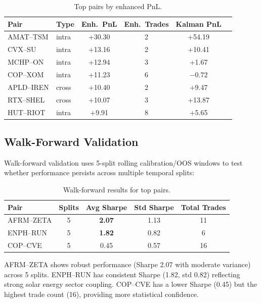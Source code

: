 \documentclass[11pt, a4paper]{article}
\begin{document}
\begin{table}[H]
\centering
\caption{Top pairs by enhanced PnL.}
\begin{tabular}{@{}llcccc@{}}
\toprule
\textbf{Pair} & \textbf{Type} & \textbf{Enh.\ PnL} & \textbf{Enh.\ Trades} & \textbf{Kalman PnL} \\
\midrule
AMAT--TSM   & intra & +30.30 & 2 & +54.19 \\
CVX--SU     & intra & +13.16 & 2 & +10.41 \\
MCHP--ON    & intra & +12.94 & 3 & +1.67  \\
COP--XOM    & intra & +11.23 & 6 & $-0.72$  \\
APLD--IREN  & cross & +10.40 & 2 & +9.47  \\
RTX--SHEL   & cross & +10.07 & 3 & +13.87 \\
HUT--RIOT   & intra & +9.91  & 8 & +5.65  \\
\bottomrule
\end{tabular}
\label{tab:top-enhanced}
\end{table}

\subsection{Walk-Forward Validation}

Walk-forward validation uses 5-split rolling calibration/OOS windows to test whether performance persists across multiple temporal splits:

\begin{table}[H]
\centering
\caption{Walk-forward results for top pairs.}
\begin{tabular}{@{}lcccc@{}}
\toprule
\textbf{Pair} & \textbf{Splits} & \textbf{Avg Sharpe} & \textbf{Std Sharpe} & \textbf{Total Trades} \\
\midrule
AFRM--ZETA  & 5 & \textbf{2.07} & 1.13 & 11 \\
ENPH--RUN   & 5 & \textbf{1.82} & 0.82 & 6  \\
COP--CVE    & 5 & 0.45          & 0.57 & 16 \\
\bottomrule
\end{tabular}
\label{tab:walk-forward}
\end{table}

AFRM--ZETA shows robust performance (Sharpe 2.07 with moderate variance) across 5 splits. ENPH--RUN has consistent Sharpe (1.82, std 0.82) reflecting strong solar energy sector coupling. COP--CVE has a lower Sharpe (0.45) but the highest trade count (16), providing more statistical confidence.
\end{document}

